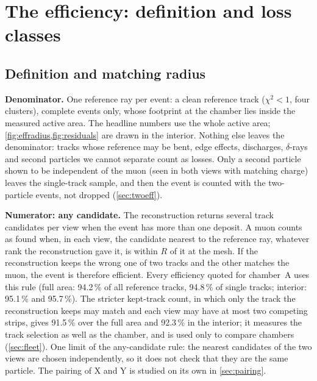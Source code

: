 \section{The efficiency: definition and loss classes}\label{app:effdef}

\subsection{Definition and matching radius}
\textbf{Denominator.} One reference ray per event: a clean reference track ($\chi^2<1$, four clusters), complete
events only, whose footprint at the chamber lies inside the measured active area. The headline numbers use the whole
active area; \cref{fig:effradius,fig:residuals} are drawn in the interior. Nothing else leaves the denominator: tracks
whose reference may be bent, edge effects, discharges, $\delta$-rays and second particles we cannot separate count as
losses. Only a second particle shown to be independent of the muon (seen in both views with matching charge) leaves
the single-track sample, and then the event is counted with the two-particle events, not dropped
(\cref{sec:twoeff}).

\textbf{Numerator: any candidate.} The reconstruction returns several track candidates per view when the event has
more than one deposit. A muon counts as found when, in each view, the candidate nearest to the reference ray, whatever
rank the reconstruction gave it, is within $R$ of it at the mesh. If the reconstruction keeps the wrong one of two
tracks and the other matches the muon, the event is therefore efficient. Every efficiency quoted for chamber~A uses
this rule (full area: 94.2\,\% of all reference tracks, 94.8\,\% of single tracks; interior: 95.1\,\% and 95.7\,\%). The
stricter kept-track count, in which only the track the reconstruction keeps may match and each view may have at most
two competing strips, gives 91.5\,\% over the full area and 92.3\,\% in the interior; it measures the track selection
as well as the chamber, and is used only to compare chambers (\cref{sec:fleet}). One limit of the any-candidate rule:
the nearest candidates of the two views are chosen independently, so it does not check that they are the same
particle. The pairing of X and Y is studied on its own in \cref{sec:pairing}.

